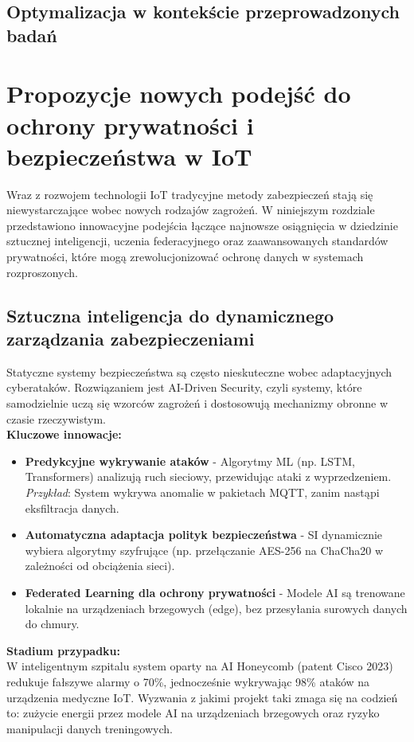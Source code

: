\subsection{Optymalizacja w kontekście przeprowadzonych badań}

\section{Propozycje nowych podejść do ochrony prywatności i bezpieczeństwa w IoT}
Wraz z rozwojem technologii IoT tradycyjne metody zabezpieczeń stają się niewystarczające wobec nowych rodzajów zagrożeń. W niniejszym rozdziale przedstawiono innowacyjne podejścia łączące najnowsze osiągnięcia w dziedzinie sztucznej inteligencji, uczenia federacyjnego oraz zaawansowanych standardów prywatności, które mogą zrewolucjonizować ochronę danych w systemach rozproszonych.
\subsection{Sztuczna inteligencja do dynamicznego zarządzania zabezpieczeniami}
Statyczne systemy bezpieczeństwa są często nieskuteczne wobec adaptacyjnych cyberataków. Rozwiązaniem jest AI-Driven Security, czyli systemy, które samodzielnie uczą się wzorców zagrożeń i dostosowują mechanizmy obronne w czasie rzeczywistym. \\
\textbf{Kluczowe innowacje:}
\begin{itemize}
    \item \textbf{Predykcyjne wykrywanie ataków} - Algorytmy ML (np. LSTM, Transformers) analizują ruch sieciowy, przewidując ataki z wyprzedzeniem. \textit{Przykład}: System wykrywa anomalie w pakietach MQTT, zanim nastąpi eksfiltracja danych.
    \item \textbf{Automatyczna adaptacja polityk bezpieczeństwa} - SI dynamicznie wybiera algorytmy szyfrujące (np. przełączanie AES-256 na ChaCha20 w zależności od obciążenia sieci).
    \item \textbf{Federated Learning dla ochrony prywatności} - Modele AI są trenowane lokalnie na urządzeniach brzegowych (edge), bez przesyłania surowych danych do chmury.
\end{itemize}
\textbf{Stadium przypadku:} \\
W inteligentnym szpitalu system oparty na AI Honeycomb (patent Cisco 2023) redukuje fałszywe alarmy o 70\%, jednocześnie wykrywając 98\% ataków na urządzenia medyczne IoT. Wyzwania z jakimi projekt taki zmaga się na codzień to: zużycie energii przez modele AI na urządzeniach brzegowych oraz ryzyko manipulacji danych treningowych.

